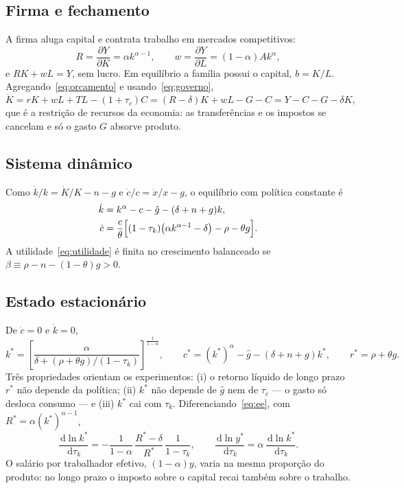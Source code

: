 \documentclass[11pt,a4paper]{article}
\newcommand{\dd}{\,\mathrm{d}}
\begin{document}
\subsection{Firma e fechamento}
A firma aluga capital e contrata trabalho em mercados competitivos:
\begin{equation}
 R=\frac{\partial Y}{\partial K}=\alpha k^{\alpha-1},\qquad
 w=\frac{\partial Y}{\partial L}=(1-\alpha)Ak^\alpha,
 \label{eq:precos}
\end{equation}
e $RK+wL=Y$, sem lucro. Em equilíbrio a família possui o capital, $b=K/L$.
Agregando~\eqref{eq:orcamento} e usando~\eqref{eq:governo},
\[
 \dot K=rK+wL+TL-(1+\tau_c)C=(R-\delta)K+wL-G-C=Y-C-G-\delta K,
\]
que é a restrição de recursos da economia: as transferências e os impostos
se cancelam e só o gasto $G$ absorve produto.

\subsection{Sistema dinâmico}
Como $\dot k/k=\dot K/K-n-g$ e $\dot c/c=\dot x/x-g$, o equilíbrio com política
constante é
\begin{align}
 \dot k&=k^\alpha-c-\hat g-(\delta+n+g)k, \label{eq:kdot}\\
 \dot c&=\frac{c}{\theta}\Bigl[(1-\tau_k)\bigl(\alpha k^{\alpha-1}-\delta\bigr)-\rho-\theta g\Bigr].
 \label{eq:cdot}
\end{align}
A utilidade~\eqref{eq:utilidade} é finita no crescimento balanceado se
$\beta\equiv\rho-n-(1-\theta)g>0$.

\subsection{Estado estacionário}
De $\dot c=0$ e $\dot k=0$,
\begin{equation}
 k^*=\left[\frac{\alpha}{\delta+(\rho+\theta g)/(1-\tau_k)}\right]^{\frac1{1-\alpha}},
 \qquad
 c^*=(k^*)^\alpha-\hat g-(\delta+n+g)k^*,
 \qquad
 r^*=\rho+\theta g.
 \label{eq:ee}
\end{equation}
Três propriedades orientam os experimentos: (i) o retorno líquido de longo
prazo $r^*$ não depende da política; (ii) $k^*$ não depende de $\hat g$ nem de
$\tau_c$ --- o gasto só desloca consumo --- e (iii) $k^*$ cai com $\tau_k$.
Diferenciando~\eqref{eq:ee}, com $R^*=\alpha (k^*)^{\alpha-1}$,
\begin{equation}
 \frac{\dd\ln k^*}{\dd\tau_k}
 =-\frac{1}{1-\alpha}\,\frac{R^*-\delta}{R^*}\,\frac{1}{1-\tau_k},
 \qquad
 \frac{\dd\ln y^*}{\dd\tau_k}=\alpha\,\frac{\dd\ln k^*}{\dd\tau_k}.
 \label{eq:elasticidade}
\end{equation}
O salário por trabalhador efetivo, $(1-\alpha)y$, varia na mesma proporção
do produto: no longo prazo o imposto sobre o capital recai também sobre o
trabalho.
\end{document}
